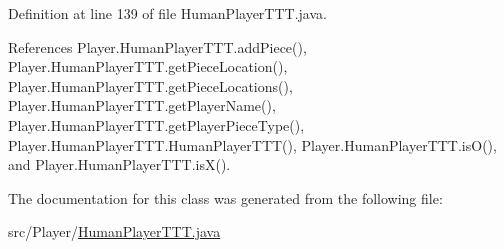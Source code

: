Definition at line 139 of file Human\+Player\+T\+T\+T.\+java.



References Player.\+Human\+Player\+T\+T\+T.\+add\+Piece(), Player.\+Human\+Player\+T\+T\+T.\+get\+Piece\+Location(), Player.\+Human\+Player\+T\+T\+T.\+get\+Piece\+Locations(), Player.\+Human\+Player\+T\+T\+T.\+get\+Player\+Name(), Player.\+Human\+Player\+T\+T\+T.\+get\+Player\+Piece\+Type(), Player.\+Human\+Player\+T\+T\+T.\+Human\+Player\+T\+T\+T(), Player.\+Human\+Player\+T\+T\+T.\+is\+O(), and Player.\+Human\+Player\+T\+T\+T.\+is\+X().



The documentation for this class was generated from the following file\+:\begin{DoxyCompactItemize}
\item 
src/\+Player/\hyperlink{_human_player_t_t_t_8java}{Human\+Player\+T\+T\+T.\+java}\end{DoxyCompactItemize}
